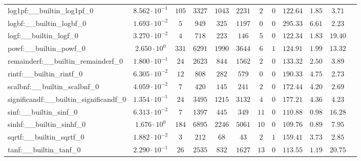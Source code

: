 \begin{tabular}{|l|c|c|c|c|c|c|c|c|c|c|c|}
log1pf:\_\_builtin\_log1pf\_0             & $ 8.562 \cdot 10^{-1} $ & $ 105    $ & $ 3327   $ & $ 1043  $ & $ 2231  $ & $ 2   $ & $ 0 $ & $ 122.64      $ & $ 1.85    $ & $ 3.71    $ \\
logbf:\_\_builtin\_logbf\_0               & $ 1.693 \cdot 10^{-2} $ & $ 5      $ & $ 949    $ & $ 325   $ & $ 1197  $ & $ 0   $ & $ 0 $ & $ 295.33      $ & $ 6.61    $ & $ 2.23    $ \\
logf:\_\_builtin\_logf\_0                 & $ 3.270 \cdot 10^{-2} $ & $ 4      $ & $ 718    $ & $ 223   $ & $ 146   $ & $ 5   $ & $ 0 $ & $ 122.34      $ & $ 1.83    $ & $ 19.40   $ \\
powf:\_\_builtin\_powf\_0                 & $ 2.650 \cdot 10^{0}  $ & $ 331    $ & $ 6291   $ & $ 1990  $ & $ 3644  $ & $ 6   $ & $ 1 $ & $ 124.91      $ & $ 1.99    $ & $ 13.32   $ \\
remainderf:\_\_builtin\_remainderf\_0     & $ 1.800 \cdot 10^{-1} $ & $ 24     $ & $ 2623   $ & $ 844   $ & $ 1562  $ & $ 2   $ & $ 0 $ & $ 133.32      $ & $ 2.50    $ & $ 3.89    $ \\
rintf:\_\_builtin\_rintf\_0               & $ 6.305 \cdot 10^{-2} $ & $ 12     $ & $ 808    $ & $ 282   $ & $ 579   $ & $ 0   $ & $ 0 $ & $ 190.33      $ & $ 4.75    $ & $ 2.73    $ \\
scalbnf:\_\_builtin\_scalbnf\_0           & $ 4.059 \cdot 10^{-2} $ & $ 7      $ & $ 420    $ & $ 145   $ & $ 241   $ & $ 2   $ & $ 0 $ & $ 172.44      $ & $ 4.20    $ & $ 2.69    $ \\
significandf:\_\_builtin\_significandf\_0 & $ 1.354 \cdot 10^{-1} $ & $ 24     $ & $ 3495   $ & $ 1215  $ & $ 3132  $ & $ 4   $ & $ 0 $ & $ 177.21      $ & $ 4.36    $ & $ 4.23    $ \\
sinf:\_\_builtin\_sinf\_0                 & $ 6.313 \cdot 10^{-2} $ & $ 7      $ & $ 1397   $ & $ 445   $ & $ 349   $ & $ 11  $ & $ 0 $ & $ 110.88      $ & $ 0.98    $ & $ 16.28   $ \\
sinhf:\_\_builtin\_sinhf\_0               & $ 1.676 \cdot 10^{0}  $ & $ 184    $ & $ 6895   $ & $ 2246  $ & $ 5061  $ & $ 10  $ & $ 0 $ & $ 109.76      $ & $ 0.89    $ & $ 7.95    $ \\
sqrtf:\_\_builtin\_sqrtf\_0               & $ 1.882 \cdot 10^{-2} $ & $ 3      $ & $ 212    $ & $ 68    $ & $ 43    $ & $ 2   $ & $ 1 $ & $ 159.41      $ & $ 3.73    $ & $ 2.85    $ \\
tanf:\_\_builtin\_tanf\_0                 & $ 2.290 \cdot 10^{-1} $ & $ 26     $ & $ 2535   $ & $ 832   $ & $ 1627  $ & $ 13  $ & $ 0 $ & $ 113.55      $ & $ 1.19    $ & $ 20.75   $ \\

\end{tabular}
